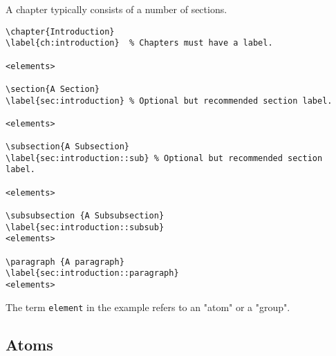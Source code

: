 \begin{example}[Sections]

A chapter typically consists of a number of sections.

\begin{lstlisting}
\chapter{Introduction}
\label{ch:introduction}  % Chapters must have a label.
   
<elements>

\section{A Section}
\label{sec:introduction} % Optional but recommended section label.   

<elements>

\subsection{A Subsection}
\label{sec:introduction::sub} % Optional but recommended section label.   

<elements>

\subsubsection {A Subsubsection}
\label{sec:introduction::subsub}
<elements>

\paragraph {A paragraph}
\label{sec:introduction::paragraph}
<elements>

\end{lstlisting}

The term \lstinline`element` in the example refers to an "atom" or a "group".
\end{example}



\subsection{Atoms}
\label{sec:mtl::atoms}


